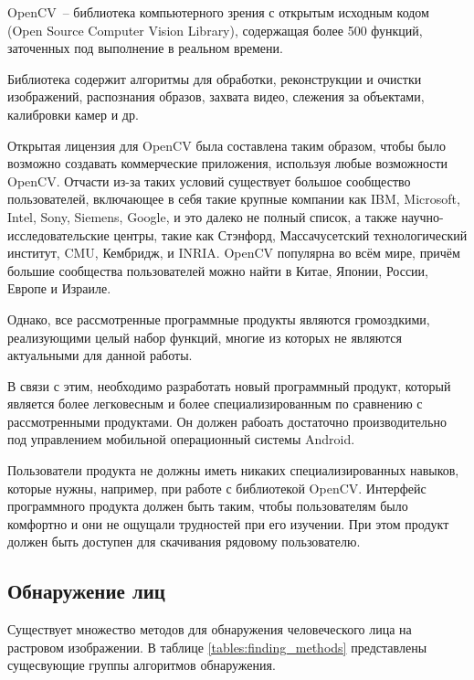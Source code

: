 OpenCV~-- библиотека компьютерного зрения с открытым исходным кодом
(Open Source Computer Vision Library), содержащая более 500
функций, заточенных под выполнение в реальном времени.

Библиотека содержит алгоритмы для обработки, реконструкции и
очистки изображений, распознания образов, захвата видео,
слежения за объектами, калибровки камер и др.

Открытая лицензия для OpenCV была составлена таким образом, чтобы было
возможно создавать коммерческие приложения, используя
любые возможности OpenCV. 
Отчасти из-за таких условий существует
большое сообщество пользователей, включающее в себя такие крупные
компании как IBM, Microsoft, Intel, Sony,
Siemens, Google, и это далеко не полный список, а также научно-исследовательские
центры, такие как Стэнфорд, Массачусетский технологический
институт, CMU, Кембридж, и INRIA. OpenCV популярна во всём мире,
причём большие сообщества пользователей можно найти в Китае,
Японии, России, Европе и Израиле.

Однако, все рассмотренные программные продукты являются громоздкими, реализующими
целый набор функций, многие из которых не являются актуальными
для данной работы.

В связи с этим, необходимо разработать новый программный продукт, который
является более легковесным и более специализированным по сравнению с
рассмотренными продуктами. Он должен рабоать достаточно производительно под
управлением мобильной операционный системы Android.

Пользователи продукта не должны иметь никаких специализированных навыков,
которые нужны, например, при работе с библиотекой OpenCV. Интерфейс
программного продукта должен быть таким, чтобы пользователям было комфортно
и они не ощущали трудностей при его изучении. При этом продукт должен быть
доступен для скачивания рядовому пользователю.

\subsection{Обнаружение лиц}

Существует множество методов для обнаружения человеческого лица
на растровом изображении.
В таблице \ref{tables:finding_methods} представлены сущесвующие
группы алгоритмов обнаружения.

